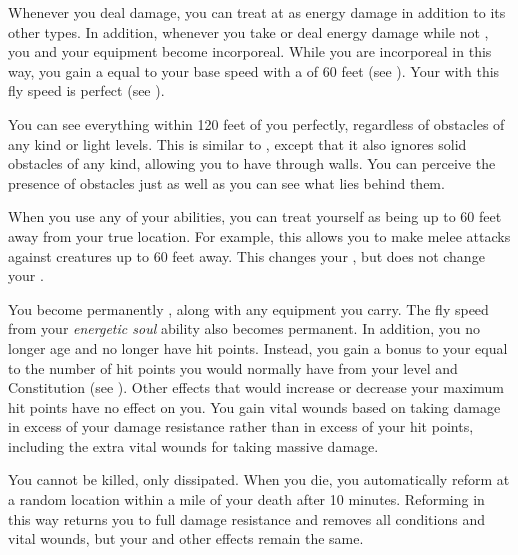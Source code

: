             Whenever you deal damage, you can treat at as energy damage in addition to its other types.
            In addition, whenever you take or deal energy damage while not , you and your equipment  become incorporeal.
            While you are incorporeal in this way, you gain a  equal to your base speed with a  of 60 feet (see ).
            Your  with this fly speed is perfect (see ).

             You can see everything within 120 feet of you perfectly, regardless of obstacles of any kind or light levels.
            This is similar to , except that it also ignores solid obstacles of any kind, allowing you to have  through walls.
            You can perceive the presence of obstacles just as well as you can see what lies behind them.

             When you use any of your abilities, you can treat yourself as being up to 60 feet away from your true location.
            For example, this allows you to make melee attacks against creatures up to 60 feet away.
            This changes your , but does not change your .

             You become permanently , along with any equipment you carry.
            The fly speed from your \textit{energetic soul} ability also becomes permanent.
            In addition, you no longer age and no longer have hit points.
            Instead, you gain a bonus to your  equal to the number of hit points you would normally have from your level and Constitution (see ).
            Other effects that would increase or decrease your maximum hit points have no effect on you.
            You gain vital wounds based on taking damage in excess of your damage resistance rather than in excess of your hit points, including the extra vital wounds for taking massive damage.

             You cannot be killed, only dissipated.
            When you die, you automatically reform at a random location within a mile of your death after 10 minutes.
            Reforming in this way returns you to full damage resistance and removes all conditions and vital wounds, but your  and other effects remain the same.

